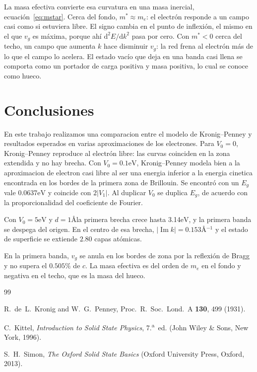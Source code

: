 \documentclass[reprint, amsmath, amssymb, aps, prb]{revtex4-2}
\begin{document}
La masa efectiva convierte esa curvatura en una masa inercial, ecuación~\eqref{eq:mstar}. Cerca del fondo, $m^*\approx m_e$: el electrón responde a un campo casi como si estuviera libre. El signo cambia en el punto de inflexión, el mismo en el que $v_g$ es máxima, porque ahí $\mathrm{d}^2E/\mathrm{d}k^2$ pasa por cero. Con $m^*<0$ cerca del techo, un campo que aumenta $k$ hace disminuir $v_g$: la red frena al electrón más de lo que el campo lo acelera. El estado vacío que deja en una banda casi llena se comporta como un portador de carga positiva y masa positiva, lo cual se conoce como hueco.


\section{Conclusiones}

En este trabajo realizamos una comparacion entre el modelo de Kronig--Penney y resultados esperados en varias aproximaciones de los electrones. Para $V_0=0$, Kronig--Penney reproduce al electrón libre: las curvas coinciden en la zona extendida y no hay brecha. 
Con $V_0=0.1\text{eV}$, Kronig--Penney modela bien a la aproximacion de electron casi libre al ser una energia inferior a la energia cinetica encontrada en los bordes de la primera zona de Brillouin. Se encontró con un $E_g$ vale 0.0637$\text{eV}$ y coincide con $2|V_1|$. Al duplicar $V_0$ se duplica $E_g$, de acuerdo con la proporcionalidad del coeficiente de Fourier. 

Con $V_0=5\text{eV}$ y $d=1$\AA la primera brecha crece hasta 3.14$\text{eV}$, y la primera banda se despega del origen. En el centro de esa brecha, $|\operatorname{Im}k|=0.153$\AA$^{-1}$ y el estado de superficie se extiende $2.80$ capas atómicas.

En la primera banda, $v_g$ se anula en los bordes de zona por la reflexión de Bragg y no supera el $0.505\%$ de $c$. La masa efectiva es del orden de $m_e$ en el fondo y negativa en el techo, que es la masa del hueco.



\begin{thebibliography}{99}

R.~de~L.~Kronig and W.~G.~Penney,
Proc.~R.~Soc.~Lond.~A \textbf{130}, 499 (1931).

C.~Kittel, \emph{Introduction to Solid State Physics}, 7.\textsuperscript{a}~ed.
(John Wiley \& Sons, New York, 1996).

S.~H.~Simon, \emph{The Oxford Solid State Basics}
(Oxford University Press, Oxford, 2013).
\end{thebibliography}
\end{document}
